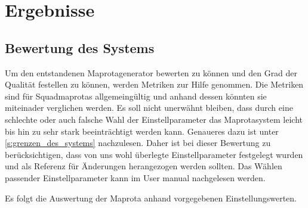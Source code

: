 \section{Ergebnisse}
    
    \subsection{Bewertung des Systems}
        \label{sec:bewerten_des_systems}
        Um den entstandenen Maprotagenerator bewerten zu können und den Grad der Qualität festellen zu können, 
        werden Metriken zur Hilfe genommen. Die Metriken sind für Squadmaprotas
        allgemeingültig und anhand dessen könnten sie miteinader verglichen werden. Es soll nicht unerwähnt bleiben,
        dass durch eine schlechte oder auch falsche Wahl der Einstellparameter das Maprotasystem leicht bis hin zu 
        sehr stark beeinträchtigt werden kann. Genaueres dazu ist unter \ref{s:grenzen_des_systems} nachzulesen.
        Daher ist bei dieser Bewertung zu berücksichtigen, dass von uns wohl überlegte Einstellparameter festgelegt wurden
        und als Referenz für Änderungen herangezogen werden sollten.
        Das Wählen passender Einstellparameter kann im User manual nachgelesen werden.
   
        Es folgt die Auswertung der Maprota anhand vorgegebenen Einstellungswerten.\\

